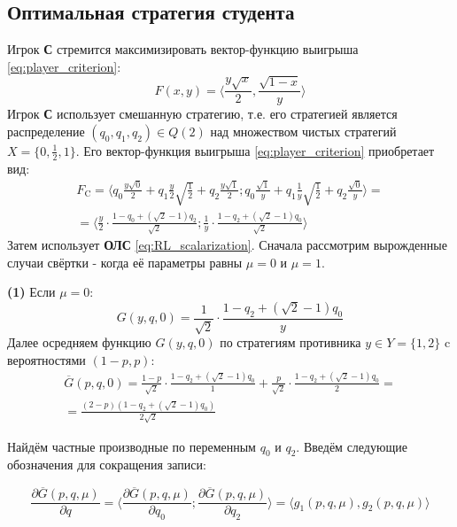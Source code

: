 \subsection{Оптимальная стратегия студента}

Игрок \textbf{С} стремится максимизировать вектор-функцию выигрыша
\eqref{eq:player_criterion}: 
$$
	F(x, y) = \Big \langle
		\frac{y\sqrt{x}}{2},\frac{\sqrt{1-x}}{y}
	\Big \rangle
$$
Игрок \textbf{С} использует смешанную стратегию, т.е. его стратегией является
распределение $(q_0,q_1,q_2) \in Q(2)$ над множеством чистых стратегий 
$X=\{0,\frac{1}{2},1\}$.
Его вектор-функция выигрыша \eqref{eq:player_criterion} приобретает вид:
\begin{gather*}
	F_\textrm{C}=
	\big \langle
		q_0\frac{y\sqrt{0}}{2} + 
		q_1\frac{y}{2} \sqrt{\frac{1}{2}} + 
		q_2\frac{y\sqrt{1}}{2};
		q_0\frac{\sqrt{1}}{y} +
		q_1\frac{1}{y} \sqrt{\frac{1}{2}} +
		q_2\frac{\sqrt{0}}{y}
	\big \rangle = 
	\\
	=\big \langle
		\frac{y}{2}\cdot\frac{1-q_0+(\sqrt{2}-1)q_2}{\sqrt{2}};
		\frac{1}{y}\cdot\frac{1-q_2+(\sqrt{2}-1)q_0}{\sqrt{2}}
	\big \rangle
\end{gather*}
Затем использует \textbf{ОЛС} \eqref{eq:RL_scalarization}. 
Сначала рассмотрим вырожденные случаи свёртки - когда её
параметры равны $\mu=0$ и  $\mu=1$. 


\textbf{(1)} 
Если $\mu=0$:
$$
	G(y,q,0)=\frac{1}{\sqrt{2}}\cdot \frac{1-q_2+(\sqrt{2}-1)q_0}{y}
$$	
Далее осредняем функцию $G(y,q,0)$ по стратегиям 
противника $y \in Y=\{1,2\}$ c вероятностями $(1-p,p)$:
\begin{gather*}
	\overline G(p,q,0)=
	\frac{1-p}{\sqrt{2}} \cdot \frac{1-q_2+(\sqrt{2}-1)q_0}{1}+
	\frac{p}{\sqrt{2}} \cdot \frac{1-q_2+(\sqrt{2}-1)q_0}{2}=\\
	=\frac{(2-p)(1-q_2+(\sqrt{2}-1)q_0)}{2\sqrt{2}}
\end{gather*}
	
Найдём частные производные по переменным $q_0$ и $q_2$. 
Введём следующие обозначения для сокращения записи:

\begin{equation}
	\frac{\partial \overline G(p,q,\mu)}{\partial q}=
	\langle 
		\frac{\partial \overline G(p,q,\mu)}{\partial q_0};
		\frac{\partial \overline G(p,q,\mu)}{\partial q_2} 
	\rangle=
	\big \langle g_1(p,q,\mu), g_2(p,q,\mu) \big \rangle
	\label{eq:G_dericative}
\end{equation}

